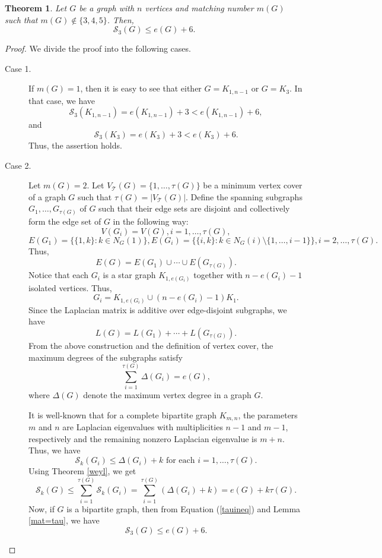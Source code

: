 \documentclass[12pt]{article}
\theoremstyle{plain}
\newtheorem{theorem}{Theorem}[section]
\theoremstyle{definition}
\begin{document}
\begin{theorem}\label{rochatr}
	Let $G$ be a graph with $n$ vertices and matching number $m(G)$ such that $m(G)\notin \{3,4,5\}$. Then, $$\mathcal{S}_3(G)\leq e(G)+6.$$	
\end{theorem}
\begin{proof}
	We divide the proof into the following cases.
	\begin{description}
		\item[Case 1.]  If $m(G)=1$, then it is easy to see that either $G=K_{1, n-1}$ or $G=K_3$. In that case, we have  $$\mathcal{S}_3\left(K_{1, n-1}\right)=e\left(K_{1, n-1}\right)+3<e\left(K_{1,n-1}\right)+6,$$ and $$ \mathcal{S}_3\left(K_3\right)=e\left(K_3\right)+3<e\left(K_3\right)+6.$$  Thus, the assertion holds.
		\item[Case 2.]  Let $m(G)=2$. Let $V_\mathcal{T}(G)=\{1,\ldots,{\tau(G)}\}$ be a minimum vertex cover of a graph $G$ such that $\tau(G)=|V_\mathcal{T}(G)|$. Define the spanning subgraphs $G_1,\ldots, G_{\tau(G)}$ of $G$ such that their edge sets are disjoint and collectively form the edge set of $G$ in the following way: 
		$$V(G_i)=V(G),i=1,\ldots,\tau(G),$$ 
		$$E(G_1)=\{\{1,k\}:k\in N_G(1)\}, E(G_i)=\{\{i,k\}: k\in N_G(i)\setminus \{1,\ldots,{i-1}\}\},i=2,\ldots,\tau(G).$$  
		Thus,
		$$E(G)=E(G_1)\cup \cdots \cup E(G_{\tau(G)}).$$  
		Notice that each $G_i$ is a star graph $K_{1,e(G_i)}$ together with $n-e(G_i)-1$ isolated vertices. Thus, 
		$$G_i=K_{1,e(G_i)}\cup (n-e(G_i)-1)K_1.$$  
		Since the Laplacian matrix is additive over edge-disjoint subgraphs, we have
		$$L(G)=L(G_1)+\cdots+L(G_{\tau(G)}).$$  
		From the above construction and the definition of vertex cover, the maximum degrees of the subgraphs satisfy
		$$\sum_{i=1}^{\tau(G)}\Delta(G_i)=e(G),$$ where $\Delta(G)$ denote the maximum vertex degree in a graph $G$.
		
		It is well-known that \cite{Brouwer2012} for a complete bipartite graph ${K_{m,n}}$, the parameters $m$ and $n$ are Laplacian eigenvalues with multiplicities $n-1$ and $m-1$, respectively and the remaining nonzero Laplacian eigenvalue is $m+n$. Thus, we have
		$$
		\mathcal{S}_k(G_i)\leq \Delta(G_i)+k\text{ for each } i= 1, \ldots,\tau(G).
		$$  
		Using Theorem \ref{weyl}, we get
		\begin{equation}\label{tauineq}
			\mathcal{S}_k(G)\leq \sum_{i=1}^{\tau(G)}\mathcal{S}_k(G_i)=\sum_{i=1}^{\tau(G)} (\Delta(G_i) + k)=e(G)+k\tau(G).
		\end{equation} 
		Now, if $G$ is a bipartite graph, then from Equation (\ref{tauineq}) and Lemma \ref{mat=tau}, we have $$\mathcal{S}_3(G)\leq e(G)+6.$$
		

\end{description}
\end{proof}
\end{document}

